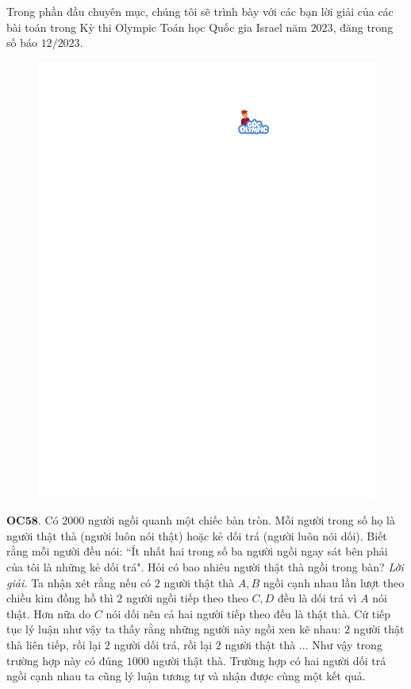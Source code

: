 \begin{multicols}{2}
	Trong phần đầu chuyên mục, chúng tôi sẽ trình bày với các bạn lời giải của các bài toán trong Kỳ thi Olympic Toán học Quốc gia Israel năm $2023$, đăng trong số báo $12/2023$. 
	\begin{figure}[H]
		\vspace*{-5pt}
		\centering
		\captionsetup{labelformat= empty, justification=centering}
		\includegraphics[width= 0.85\linewidth]{gocolympic}
		\vspace*{-5pt}
	\end{figure}
	{\bf\color{cackithi} OC$\pmb{58.}$} Có $2000$ người ngồi quanh một chiếc bàn tròn. Mỗi người trong số họ là người  thật thà (người luôn nói thật) hoặc kẻ  dối trá (người luôn nói dối). Biết rằng mỗi người đều nói: ``Ít nhất hai trong số ba người ngồi ngay sát bên phải của tôi là những kẻ dối trá". Hỏi có bao nhiêu người thật thà ngồi trong bàn?
	\vskip 0.1cm
	\textit{Lời giải.} Ta nhận xét rằng nếu có $2$ người thật thà $A, B$ ngồi cạnh nhau lần lượt theo chiều kim đồng hồ thì $2$ người ngồi tiếp theo theo $C, D$ đều là dối trá vì $A$  nói thật. Hơn nữa do $C$ nói dối nên cả hai người tiếp theo đều là thật thà. Cứ tiếp tục lý luận như vậy ta thấy rằng những người này ngồi xen kẽ nhau: $2$ người thật thà liên tiếp, rồi lại $2$ người dối trá, rồi lại $2$ người thật thà ... Như vậy trong trường hợp này có đúng $1000$ người thật thà. Trường hợp có hai người dối trá ngồi cạnh nhau ta cũng lý luận tương tự và nhận được cùng một kết quả.

\end{multicols}

